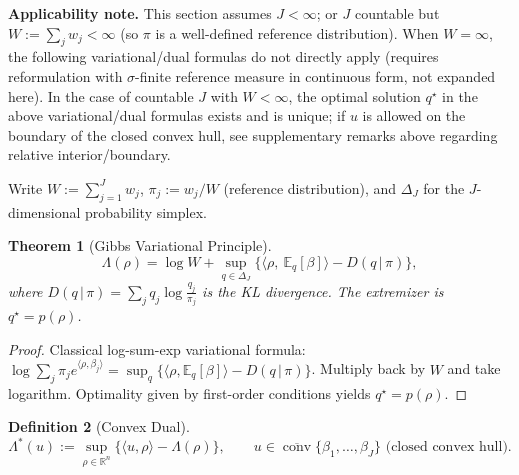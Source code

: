 \documentclass[11pt,a4paper]{article}
\newtheorem{theorem}{Theorem}[section]
\newtheorem{definition}[theorem]{Definition}
\theoremstyle{remark}
\DeclareMathOperator{\conv}{conv}
\begin{document}
\textbf{Applicability note.} This section assumes $J<\infty$; or $J$ countable but $W:=\sum_j w_j<\infty$ (so $\pi$ is a well-defined reference distribution). When $W=\infty$, the following variational/dual formulas do not directly apply (requires reformulation with $\sigma$-finite reference measure in continuous form, not expanded here). In the case of countable $J$ with $W<\infty$, the optimal solution $q^\star$ in the above variational/dual formulas exists and is unique; if $u$ is allowed on the boundary of the closed convex hull, see supplementary remarks above regarding relative interior/boundary.

Write $W:=\sum_{j=1}^J w_j$, $\pi_j:=w_j/W$ (reference distribution), and $\Delta_J$ for the $J$-dimensional probability simplex.

\begin{theorem}[Gibbs Variational Principle]\label{thm:gibbs}
\begin{equation}
\Lambda(\rho)=\log W+\sup_{q\in\Delta_J}\Big\{\big\langle \rho,\ \mathbb{E}_q[\beta]\big\rangle - D(q\,|\,\pi)\Big\},
\end{equation}
where $D(q\,|\,\pi)=\sum_j q_j\log\frac{q_j}{\pi_j}$ is the KL divergence. The extremizer is $q^\star=p(\rho)$.
\end{theorem}

\begin{proof}
Classical log-sum-exp variational formula: $\log\sum_j \pi_j e^{\langle \rho,\beta_j\rangle}=\sup_q\{\langle \rho,\mathbb{E}_q[\beta]\rangle - D(q\,|\,\pi)\}$. Multiply back by $W$ and take logarithm. Optimality given by first-order conditions yields $q^\star=p(\rho)$.
\end{proof}

\begin{definition}[Convex Dual]\label{def:dual}
\begin{equation}
\Lambda^\ast(u):=\sup_{\rho\in\mathbb{R}^n}\big\{\langle u,\rho\rangle-\Lambda(\rho)\big\},\qquad
u\in\overline{\conv}\{\beta_1,\dots,\beta_J\}\text{ (closed convex hull)}.
\end{equation}
\end{definition}
\end{document}
